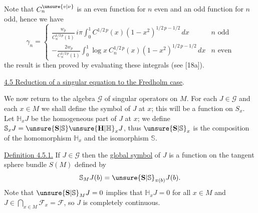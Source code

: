 
Note that $C_n^{\unsure{v|\nu}}$ is an even function for $n$ even and an odd function for $n$ odd, hence we have
\[
\gamma_n=\begin{cases}
\displaystyle\frac{w_p}{C_n^{1/2\,p}(1)}\,i\pi\int_0^1 C^{1/2\,p}(x)(1-x^2)^{1/2\,p-1/2}\,dx&n\text{ odd}\\[1.5ex]
\displaystyle-\frac{2w_p}{C_n^{1/2\,p}(1)}\int_0^1\log x\ C_n^{1/2\,p}(x)(1-x^2)^{1/2\,p-1/2}\,dx&n\text{ even}
\end{cases}
\]
the result is then proved by evaluating these integrals (see [18a]).

\uline{4.5 Reduction of a singular equation to the Fredholm case}.

We now return to the algebra $\mathcal{G}$ of singular operators on $M$. For each $J\in\mathcal{G}$ and each $x\in M$ we shall define the symbol of $J$ at $x$; this will be a function on $S_x$. Let $\mathbb{H}_xJ$ be the homogeneous part of $J$ at $x$; we define $\mathbb{S}_xJ=\unsure{\mathbf{S}|\mathbb{S}}\unsure{\mathbf{H}|\mathbb{H}}_xJ$, thus $\unsure{\mathbf{S}|\mathbb{S}}_x$ is the composition of the homomorphism $\mathbb{H}_x$ and the isomorphism $\mathbb{S}$.

\uline{Definition 4.5.1.} If $J\in\mathcal{G}$ then the \uline{global symbol} of $J$ is a function on the tangent sphere bundle $S(M)$ defined by
\[
\mathbb{S}_MJ(b)=\unsure{\mathbf{S}|\mathbb{S}}_{\pi(b)}J(b).
\]
Note that $\unsure{\mathbf{S}|\mathbb{S}}_MJ=0$ implies that $\mathbb{H}_xJ=0$ for all $x\in M$ and $J\in\bigcap_{x\in M}\mathcal{F}_x=\mathcal{F}$, so $J$ is completely continuous.
